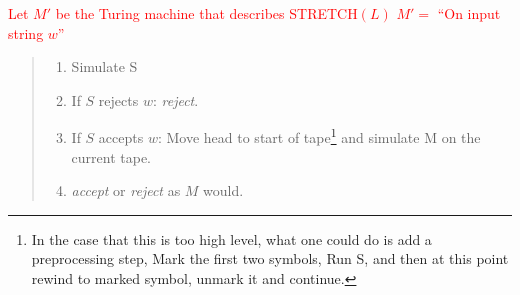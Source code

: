 \textcolor{red}{
Let $M'$ be the Turing machine that describes STRETCH$(L)$\newp
$M' = $ ``On input string $w$''
\begin{quote}
\begin{enumerate}
    \item[1.] Simulate S
    \item[2.] If $S$ rejects $w$: \emph{reject}.
    \item[3.] If $S$ accepts $w$: Move head to start of tape\footnote{In the case that this is too high level, what one could do is add a preprocessing step, Mark the first two symbols, Run S, and then at this point rewind to marked symbol, unmark it and continue.} and simulate M on the current tape.
    \item[4.] \emph{accept} or \emph{reject} as $M$ would.
\end{enumerate}
\end{quote}
}